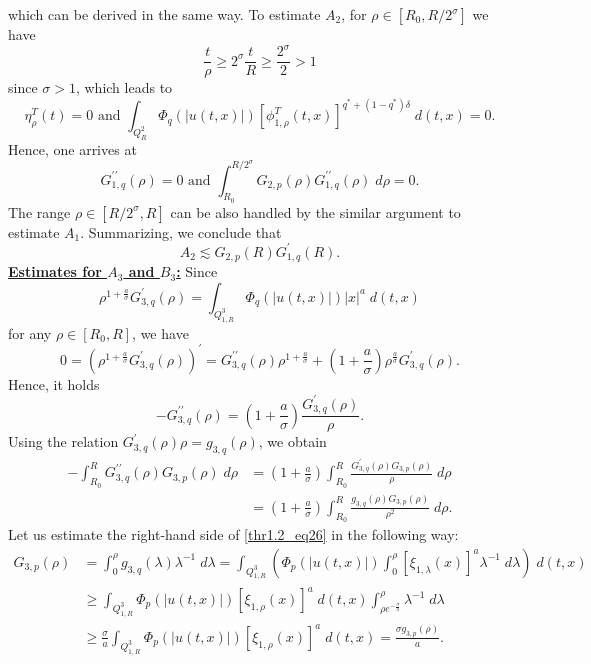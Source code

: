 \documentclass[11pt,reqno]{amsart}
\newcommand{\tron}[1]{\left( #1 \right)}
\numberwithin{equation}{section}
\newtheorem{proposition}[theorem]{Proposition}
\begin{document}
which can be derived in the same way. To estimate $A_2$, for $\rho\in [R_0,R/2^{\sigma}]$ we have
\[
\frac{t}{\rho}\geq 2^{\sigma}\frac{t}{R}\geq \frac{2^{\sigma}}{2}>1
\]
since $\sigma>1$, which leads to
\[
\eta^{T}_{\rho}(t)=0 \text{ and }\int_{Q^2_{R}}\Phi_q(|u(t,x)|)[\phi^{T}_{1,\rho}(t,x)]^{q^*+(1-q^*)\delta}\;d(t,x)=0.
\]
Hence, one arrives at
\[
G^{\prime \prime}_{1,q}(\rho)=0\text{ and }\int^{R/2^{\sigma}}_{R_0}G_{2,p}(\rho)G^{\prime \prime}_{1,q}(\rho)\;d\rho=0.
\]
The range $\rho \in [R/2^{\sigma},R]$ can be also handled by the similar argument to estimate $A_1$. Summarizing, we conclude that
\begin{equation}
A_2\lesssim G_{2,p}(R)G^{\prime}_{1,q}(R). \label{esA2}
\end{equation}
\noindent \underline{{\bf Estimates for $A_3$ and $B_3$:}} Since 
\[
\rho^{1+\frac{a}{\sigma}}G^{\prime}_{3,q}(\rho)=\int_{Q^3_{1,R}}\Phi_q(|u(t,x)|)|x|^{a}\;d(t,x)
\]
for any $\rho \in [R_0,R]$, we have
\[
0=\tron{\rho^{1+\frac{a}{\sigma}}G^{\prime}_{3,q}(\rho)}^{\prime}=G^{\prime \prime}_{3,q}(\rho)\rho^{1+\frac{a}{\sigma}}+\left(1+\frac{a}{\sigma}\right)\rho^{\frac{a}{\sigma}}G^{\prime}_{3,q}(\rho).
\]
Hence, it holds
\[
  -G^{\prime \prime}_{3,q}(\rho)=\tron{1+\frac{a}{\sigma}}\frac{G^{\prime}_{3,q}(\rho)}{\rho}.  
\]
Using the relation $G^{\prime}_{3,q}(\rho)\rho=g_{3,q}(\rho)$, we obtain
\begin{align}
-\int_{R_0}^{R}G^{\prime \prime}_{3,q}(\rho)G_{3,p}(\rho)\;d\rho&=\tron{1+\frac{a}{\sigma}}\int_{R_0}^{R}\frac{G^{\prime}_{3,q}(\rho)G_{3,p}(\rho)}{\rho}\;d\rho\nonumber\\
&=\tron{1+\frac{a}{\sigma}}\int_{R_0}^{R}\frac{g_{3,q}(\rho)G_{3,p}(\rho)}{\rho^{2}}\;d\rho.\label{thr1.2_eq26}
\end{align}
Let us estimate the right-hand side of \eqref{thr1.2_eq26} in the following way:
\begin{align*}
G_{3,p}(\rho)&=\int_{0}^{\rho}g_{3,q}(\lambda)\lambda^{-1}\;d\lambda=\int_{Q^3_{1,R}}\tron{\Phi_p(|u(t,x)|)\int_{0}^{\rho}[\xi_{1,\lambda}(x)]^{a}\lambda^{-1}\;d\lambda}\;d(t,x)\\
&\geq \int_{Q^3_{1,R}}\Phi_p(|u(t,x)|)[\xi_{1,\rho}(x)]^{a}\;d(t,x)\int_{\rho e^{-\frac{\sigma}{a}}}^{\rho}\lambda^{-1}\;d\lambda\\
&\geq \frac{\sigma}{a}\int_{Q^3_{1,R}}\Phi_p(|u(t,x)|)[\xi_{1,\rho}(x)]^{a}\;d(t,x)=\frac{\sigma g_{3,p}(\rho)}{a}.
\end{align*}
\end{document}
